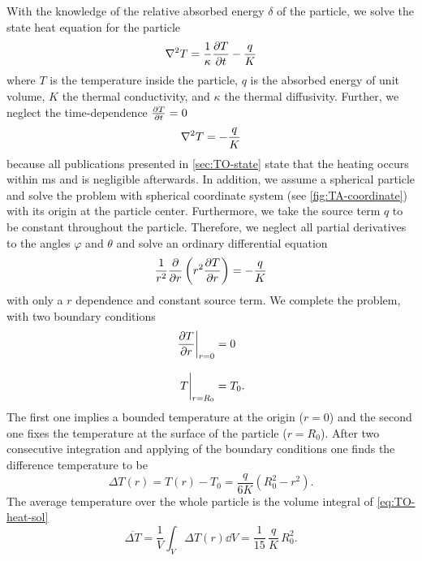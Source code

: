 With the knowledge of the relative absorbed energy $\delta$ of the particle, we 
solve the state heat equation for the particle
\begin{equation}
  \laplacian{T} = \frac{1}{\kappa} \pdv{T}{t} - \frac{q}{K}
  \label{eq:TO-heat-prob}
\end{equation}
where $T$ is the temperature inside the particle, $q$ is the absorbed energy of 
unit volume, $K$ the thermal conductivity, and $\kappa$ the thermal 
diffusivity. Further, we neglect the time-dependence $\pdv{T}{t}= 0$
\begin{equation}
  \laplacian{T} = - \frac{q}{K}
  \label{eq:TO-heat-stat}
\end{equation}
because all publications presented in \cref{sec:TO-state} state that the 
heating occurs within \si{\ms} and is negligible afterwards. In addition, we 
assume a spherical particle and solve the problem with spherical coordinate 
system (see \cref{fig:TA-coordinate}) with its origin at the particle center. 
Furthermore, we take the source term $q$ to be constant throughout the 
particle. Therefore, we neglect all partial derivatives to the angles $\varphi$ 
and $\theta$ and solve an ordinary differential equation
\begin{equation}
    \frac{1}{r^{2}}\pdv{r}\left( r^{2}\pdv{T}{r} \right) = - \frac{q}{K}
  \label{eq:TO-heat-spherical}
\end{equation}
with only a $r$ dependence and constant source term. We complete the problem, 
with two boundary conditions
\begin{subequations}
\begin{align}
  \eval{\pdv{T}{r}}_{r=0} &= 0\\[3mm]
  \eval{T}_{r=R_{0}} &= T_{0}.
\end{align}
\end{subequations}
The first one implies a bounded temperature at the origin ($r=0$) and the 
second one fixes the temperature at the surface of the particle ($r=R_{0}$). 
After two consecutive integration and applying of the boundary conditions one 
finds the difference temperature to be
\begin{equation}
  \Delta T(r) = T(r) - T_{0} = \frac{q}{6K}\left( R_0^2 - r^{2} \right).
  \label{eq:TO-heat-sol}
\end{equation}
The average temperature over the whole particle is the volume integral of 
\cref{eq:TO-heat-sol}
\begin{equation}
  \overline{\Delta T} = \frac{1}{V}\int_{V}\Delta T(r) \dd{V} = 
  \frac{1}{15}\,\frac{q}{K}\,R^{2}_{0}.
  \label{eq:TO-heat-avg}
\end{equation}
